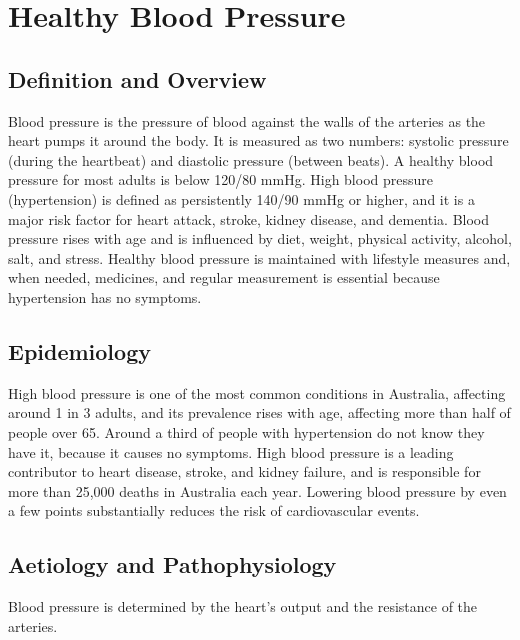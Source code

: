 \chapter{Healthy Blood Pressure}

\section*{Definition and Overview}
Blood pressure is the pressure of blood against the walls of the arteries as the heart pumps it around the body. It is measured as two numbers: systolic pressure (during the heartbeat) and diastolic pressure (between beats). A healthy blood pressure for most adults is below 120/80 mmHg. High blood pressure (hypertension) is defined as persistently 140/90 mmHg or higher, and it is a major risk factor for heart attack, stroke, kidney disease, and dementia. Blood pressure rises with age and is influenced by diet, weight, physical activity, alcohol, salt, and stress. Healthy blood pressure is maintained with lifestyle measures and, when needed, medicines, and regular measurement is essential because hypertension has no symptoms.

\section*{Epidemiology}
High blood pressure is one of the most common conditions in Australia, affecting around 1 in 3 adults, and its prevalence rises with age, affecting more than half of people over 65. Around a third of people with hypertension do not know they have it, because it causes no symptoms. High blood pressure is a leading contributor to heart disease, stroke, and kidney failure, and is responsible for more than 25,000 deaths in Australia each year. Lowering blood pressure by even a few points substantially reduces the risk of cardiovascular events.

\section*{Aetiology and Pathophysiology}
Blood pressure is determined by the heart's output and the resistance of the arteries.

